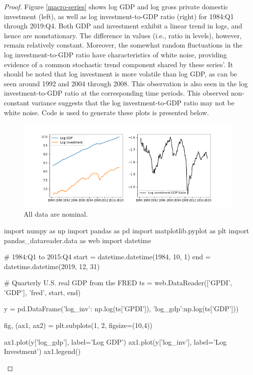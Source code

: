\documentclass[oneside,reqno]{amsart}
\theoremstyle{definition}
\begin{document}
\begin{enumerate}[label=(\roman*)]
\begin{proof}
Figure \eqref{macro-series} shows log GDP and log gross private domestic investment (left), as well as  log investment-to-GDP ratio (right) for 1984:Q1 through 2019:Q4. Both GDP and investment exhibit a linear trend in logs, and hence are nonstationary. The difference in values (i.e., ratio in levels), however, remain relatively constant. Moreover, the somewhat random fluctuations in the log investment-to-GDP ratio have characteristics of white noise, providing evidence of a common stochastic trend component shared by these series'. It should be noted that log investment is more volatile than log GDP, as can be seen around 1992 and 2004 through 2008. This observation is also seen in the log investment-to-GDP ratio at the corresponding time periods. This observed non-constant variance suggests that the log investment-to-GDP ratio may not be white noise. Code is used to generate these plots is presented below.

\begin{figure}
\includegraphics[width=\textwidth]{macro-series}
\caption{All data are nominal.}
\label{macro-series}
\end{figure}

\begin{python3code}
import numpy as np
import pandas as pd
import matplotlib.pyplot as plt
import pandas_datareader.data as web
import datetime

# 1984:Q1 to 2015:Q4
start = datetime.datetime(1984, 10, 1)
end = datetime.datetime(2019, 12, 31)

# Quarterly U.S. real GDP from the FRED
ts = web.DataReader(['GPDI', 'GDP'], 'fred', start, end)

y = pd.DataFrame({'log_inv': np.log(ts['GPDI']),
                  'log_gdp':np.log(ts['GDP'])})
                  
fig, (ax1, ax2) = plt.subplots(1, 2, figsize=(10,4))

ax1.plot(y['log_gdp'], label='Log GDP')
ax1.plot(y['log_inv'], label='Log Investment')
ax1.legend()


\end{python3code}
\end{proof}
\end{enumerate}
\end{document}
